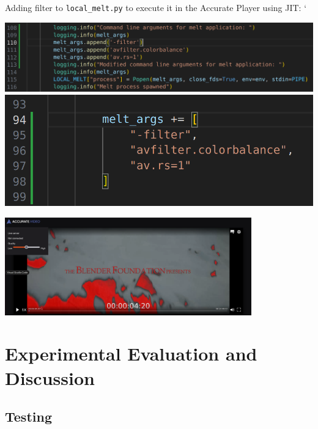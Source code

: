 \documentclass[12pt,a4paper]{article}
\begin{document}
Adding filter to \texttt{local\_melt.py} to execute it in the Accurate Player using JIT:
`
\begin{center}
	\includegraphics[height=0.13\textwidth]{code.png}
	\includegraphics[height=0.13\textwidth]{codecleaner.png}
\end{center}

\begin{center}
	\includegraphics[width=0.8\textwidth]{ap_red.png}
\end{center}




%
%
%
%
%
%
%
%
\newpage
\section{Experimental Evaluation and Discussion} \label{section:experimentalevaluationanddiscussion}


\subsection{Testing} \label{subsection:testing}


\end{document}
